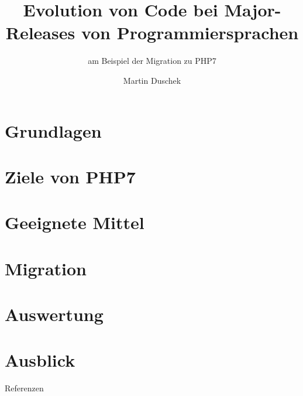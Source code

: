 \documentclass[11pt, xcolor=dvipsnames]{beamer}
\author{Martin Duschek}
\title{Evolution von Code bei Major-Releases von Programmiersprachen}
\subtitle{am Beispiel der Migration zu PHP7}
\institute{HTWK Leipzig}
\begin{document}
	

	\section{Grundlagen}
	
	
	\section{Ziele von PHP7}
	
	
	\section{Geeignete Mittel}
	

	\section{Migration}
		

	\section{Auswertung}
	

	\section{Ausblick}
	

	\begin{frame}[allowframebreaks]{Referenzen}
		
			  
	  \end{frame}
\end{document}
